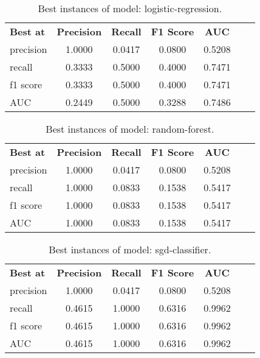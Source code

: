     \begin{table}[ht]
        \centering
        \caption{Best instances of model: logistic-regression.}
        \begin{tabular}{lcccccc}
          \textbf{Best at}  & \textbf{Precision} & \textbf{Recall} & \textbf{F1 Score} & \textbf{AUC} \\
            precision & 1.0000 & 0.0417 & 0.0800 & 0.5208 \\
            recall & 0.3333 & 0.5000 & 0.4000 & 0.7471 \\
            f1 score & 0.3333 & 0.5000 & 0.4000 & 0.7471 \\
            AUC & 0.2449 & 0.5000 & 0.3288 & 0.7486 \\
        \end{tabular}
    \end{table}


    \begin{table}[ht]
        \centering
        \caption{Best instances of model: random-forest.}
        \begin{tabular}{lcccccc}
          \textbf{Best at}  & \textbf{Precision} & \textbf{Recall} & \textbf{F1 Score} & \textbf{AUC} \\
            precision & 1.0000 & 0.0417 & 0.0800 & 0.5208 \\
            recall & 1.0000 & 0.0833 & 0.1538 & 0.5417 \\
            f1 score & 1.0000 & 0.0833 & 0.1538 & 0.5417 \\
            AUC & 1.0000 & 0.0833 & 0.1538 & 0.5417 \\
        \end{tabular}
    \end{table}


    \begin{table}[ht]
        \centering
        \caption{Best instances of model: sgd-classifier.}
        \begin{tabular}{lcccccc}
          \textbf{Best at}  & \textbf{Precision} & \textbf{Recall} & \textbf{F1 Score} & \textbf{AUC} \\
            precision & 1.0000 & 0.0417 & 0.0800 & 0.5208 \\
            recall & 0.4615 & 1.0000 & 0.6316 & 0.9962 \\
            f1 score & 0.4615 & 1.0000 & 0.6316 & 0.9962 \\
            AUC & 0.4615 & 1.0000 & 0.6316 & 0.9962 \\
        \end{tabular}
    \end{table}


